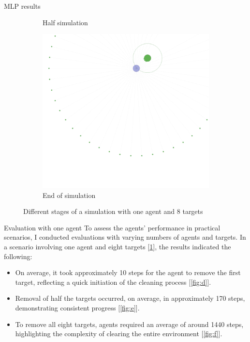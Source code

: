 \documentclass[presentation]{beamer}\mode<presentation>{\usetheme{AMSBolognaFC}}
\begin{document}
\begin{frame}[allowframebreaks]{MLP results}
\begin{figure}
\begin{subfigure}[b]{0.45\textwidth}
			\caption{Half simulation}
		\end{subfigure}
		\hfill
		\begin{subfigure}[b]{0.45\textwidth}
			\centering
			\includegraphics[width=\textwidth]{img/1_agent_3.png}
			\caption{End of simulation} 
		\end{subfigure}
		\caption{Different stages of a simulation with one agent and 8 targets}
		\label{fig:m}
	\end{figure}

	\begin{block}{Evaluation with one agent}
		To assess the agents' performance in practical scenarios, I conducted evaluations with varying numbers of agents and targets. In a scenario involving one agent and eight targets [\ref{fig:m}], the results indicated the following:
			\begin{itemize}
			\item On average, it took approximately 10 steps for the agent to remove the first target, reflecting a quick initiation of the cleaning process [\ref{fig:d}].
			\item Removal of half the targets occurred, on average, in approximately 170 steps, demonstrating consistent progress [\ref{fig:e}].
			\item To remove all eight targets, agents required an average of around 1440 steps, highlighting the complexity of clearing the entire environment [\ref{fig:f}].
			\end{itemize}
	\end{block}


\end{frame}
\end{document}
